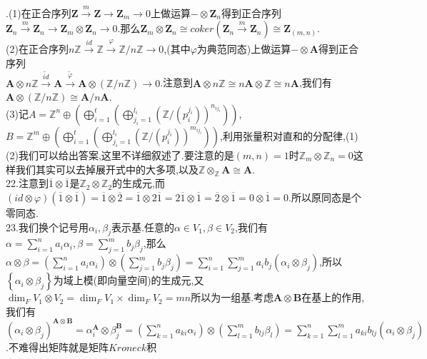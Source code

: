 \documentclass[b5paper]{ctexart}
\newcommand{\es}[5]{$#1\xrightarrow{#2}#3\xrightarrow{#4}#5\xrightarrow{}0$}
\begin{document}
\pagestyle{plain}
.(1)在正合序列\es{\mathbf{Z}}{m}{\mathbf{Z}}{}{\mathbf{Z}_m}上做运算$-\otimes \mathbf{Z}_n$得到正合序列\es{\mathbf{Z}_n}{m}{\mathbf{Z}_n}{}{\mathbf{Z}_m\otimes \mathbf{Z}_n}.那么$\mathbf{Z}_m\otimes \mathbf{Z}_n\cong coker(\mathbf{Z}_n\xrightarrow{m}\mathbf{Z}_n)\cong \mathbf{Z}_{(m,n)}$.\\
(2)在正合序列\es{n\mathbb{Z}}{id}{\mathbb{Z}}{\varphi}{\mathbb{Z}/n\mathbb{Z}},(其中$\varphi$为典范同态)上做运算$-\otimes \mathbf{A}$得到正合序列\\
\es{\mathbf{A}\otimes n\mathbb{Z}}{\tilde{id}}{\mathbf{A}}{\tilde{\varphi}}{\mathbf{A}\otimes(\mathbb{Z}/n\mathbb{Z})}.注意到$\mathbf{A}\otimes n\mathbb{Z}\cong n\mathbf{A}\otimes \mathbb{Z}\cong n\mathbf{A}$,我们有$\mathbf{A}\otimes(\mathbb{Z}/n\mathbb{Z})\cong \mathbf{A}/n\mathbf{A}$.\\
(3)记$A=\mathbb{Z}^n\oplus\left( \bigoplus_{i=1}^t\left( \bigoplus_{j_i=1}^{l_i}(\mathbb{Z}/(p_i^{j_i}))^{n_{ij_i}}\right) \right)$,$B=\mathbb{Z}^m\oplus\left( \bigoplus_{i=1}^t\left( \bigoplus_{j_i=1}^{l_i}(\mathbb{Z}/(p_i^{j_i}))^{m_{ij_i}}\right) \right)$,利用张量积对直和的分配律,(1)(2)我们可以给出答案,这里不详细叙述了.要注意的是$(m,n)=1$时$\mathbb{Z}_m\otimes\mathbb{Z}_n=0$这样我们其实可以去掉展开式中的大多项,以及$\mathbb{Z}\otimes_\mathbb{Z}
\mathbf{A}\cong \mathbf{A}$.\\
22.注意到$\overline{1}\otimes\overline{1}$是$\mathbb{Z}_2\otimes\mathbb{Z}_2$的生成元,而$(id\otimes\varphi)(\overline{1}\otimes\overline{1})=\overline{1}\otimes\overline{2}=\overline{1}\otimes2\overline{1}=2\overline{1}\otimes\overline{1}=\overline{2}\otimes\overline{1}=0\otimes\overline{1}=0.$所以原同态是个零同态.\\
23.我们换个记号用$\alpha_i,\beta_j$表示基.任意的$\alpha\in V_1,\beta\in V_2$,我们有$\alpha=\sum\limits_{i=1}^na_i\alpha_i,\beta=\sum\limits_{j=1}^mb_j\beta_j$,那么$\alpha\otimes\beta=\left( \sum\limits_{i=1}^na_i\alpha_i\right)\otimes \left( \sum\limits_{j=1}^mb_j\beta_j\right)=\sum\limits_{i=1}^n\sum\limits_{j=1}^ma_ib_j(\alpha_i\otimes \beta_j)$,所以$\left\lbrace \alpha_i\otimes\beta_j \right\rbrace$为域上模(即向量空间)的生成元,又$\dim_FV_1\otimes V_2=\dim_FV_1\times \dim_FV_2=mn$所以为一组基.考虑$\mathbf{A}\otimes\mathbf{B}$在基上的作用,我们有$\left( \alpha_i\otimes \beta_j\right)^{\mathbf{A}\otimes\mathbf{B}}=\alpha_i^{\mathbf{A}}\otimes\beta_j^{\mathbf{B}}= \left( \sum\limits_{k=1}^na_{ki}\alpha_i\right)\otimes \left( \sum\limits_{l=1}^mb_{lj}\beta_l\right)=\sum\limits_{k=1}^n\sum\limits_{l=1}^ma_{ki}b_{lj}(\alpha_i\otimes \beta_j)$.不难得出矩阵就是矩阵$Kroneck$积
\end{document}
